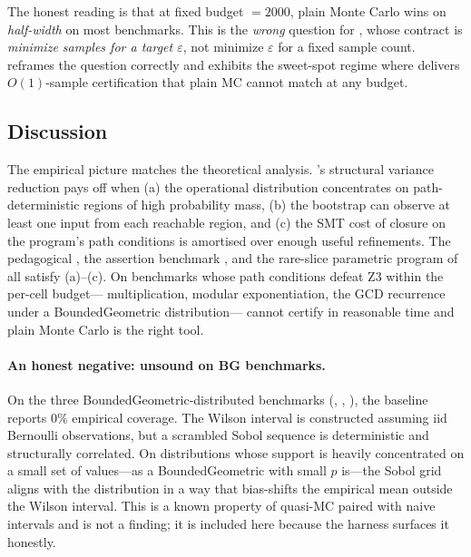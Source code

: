 The honest reading is that at fixed budget $= 2000$, plain Monte
Carlo wins on \emph{half-width} on most benchmarks.  This is the
\emph{wrong} question for \toolname{}, whose contract is
\emph{minimize samples for a target $\varepsilon$}, not minimize
$\varepsilon$ for a fixed sample count.
 reframes the question correctly and
exhibits the sweet-spot regime where \toolname{} delivers
$O(1)$-sample certification that plain MC cannot match at any budget.

\subsection{Discussion}\label{sec:discussion}

The empirical picture matches the theoretical analysis.  \toolname{}'s
structural variance reduction pays off when (a) the operational
distribution concentrates on path-deterministic regions of high
probability mass, (b) the bootstrap can observe at least one input
from each reachable region, and (c) the SMT cost of closure on the
program's path conditions is amortised over enough useful refinements.
The pedagogical , the assertion benchmark
, and the rare-slice parametric program of
 all satisfy (a)--(c).  On benchmarks
whose path conditions defeat Z3 within the per-cell budget---
multiplication, modular exponentiation, the GCD recurrence under a
BoundedGeometric distribution---\toolname{} cannot certify in
reasonable time and plain Monte Carlo is the right tool.

\paragraph{An honest negative:  unsound on BG
benchmarks.}
On the three BoundedGeometric-distributed benchmarks
(, ,
), the  baseline
reports $0\%$ empirical coverage.  The Wilson interval is constructed
assuming iid Bernoulli observations, but a scrambled Sobol sequence
is deterministic and structurally correlated.  On distributions whose
support is heavily concentrated on a small set of values---as a
BoundedGeometric with small $p$ is---the Sobol grid aligns with the
distribution in a way that bias-shifts the empirical mean outside the
Wilson interval.  This is a known property of quasi-MC paired with
naive intervals and is not a \toolname{} finding; it is included here
because the harness surfaces it honestly.

